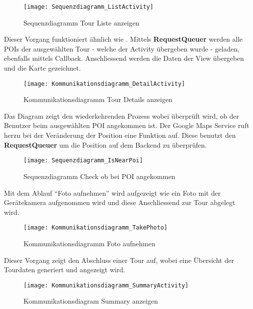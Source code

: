 \begin{figure}
  \texttt{[image: Sequenzdiagramm\_ListActivity]}
  \caption{Sequenzdiagramm Tour Liste anzeigen}
\end{figure}

Dieser Vorgang funktioniert ähnlich wie . Mittels
\textbf{RequestQueuer} werden alle POIs der ausgewählten Tour - welche der Activity übergeben
wurde - geladen, ebenfalls mittels Callback. Anschliessend werden die Daten der View
übergeben und die Karte gezeichnet.

\begin{figure}
  \texttt{[image: Kommunikationsdiagramm\_DetailActivity]}
  \caption{Kommunikationsdiagramm Tour Details anzeigen}
\end{figure}

\newpage
{}
Das Diagram zeigt den wiederkehrenden Prozess wobei überprüft wird, ob der Benutzer beim
ausgewählten POI angekommen ist. Der Google Maps Service ruft herzu bei der Veränderung
der Position eine Funktion auf. Diese benutzt den \textbf{RequestQueuer} um die Position
auf dem Backend zu überprüfen.

\begin{figure}
  \texttt{[image: Sequenzdiagramm\_IsNearPoi]}
  \caption{Sequenzdiagramm Check ob bei POI angekommen}
\end{figure}

\newpage
{}
Mit dem Ablauf ``Foto aufnehmen'' wird aufgezeigt wie ein Foto mit der Gerätekamera
aufgenommen wird und diese Anschliessend zur Tour abgelegt wird.

\begin{figure}
  \texttt{[image: Kommunikationsdiagramm\_TakePhoto]}
  \caption{Kommunikationsdiagramm Foto aufnehmen}
\end{figure}

Dieser Vorgang zeigt den Abschluss einer Tour auf, wobei eine Übersicht der Tourdaten
generiert und angezeigt wird.
\begin{figure}
  \texttt{[image: Kommunikationsdiagramm\_SummaryActivity]}
  \caption{Kommunikationsdiagram Summary anzeigen}
\end{figure}
